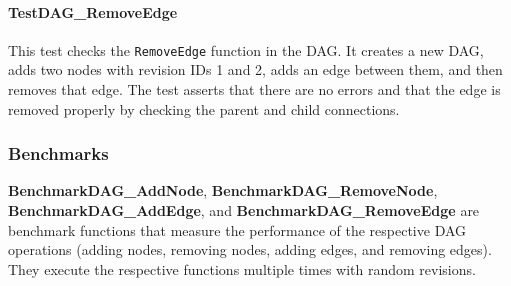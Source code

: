 \paragraph{TestDAG\_RemoveEdge}
This test checks the \lstinline{RemoveEdge} function in the DAG. It creates a new DAG, adds two nodes with revision IDs 1 and 2, adds an edge between them, and then removes that edge. The test asserts that there are no errors and that the edge is removed properly by checking the parent and child connections.

\subsubsection*{Benchmarks}


\textbf{BenchmarkDAG\_AddNode}, \textbf{BenchmarkDAG\_RemoveNode},\\\textbf{BenchmarkDAG\_AddEdge}, and \textbf{BenchmarkDAG\_RemoveEdge} are benchmark functions that measure the performance of the respective DAG operations (adding nodes, removing nodes, adding edges, and removing edges). They execute the respective functions multiple times with random revisions.





